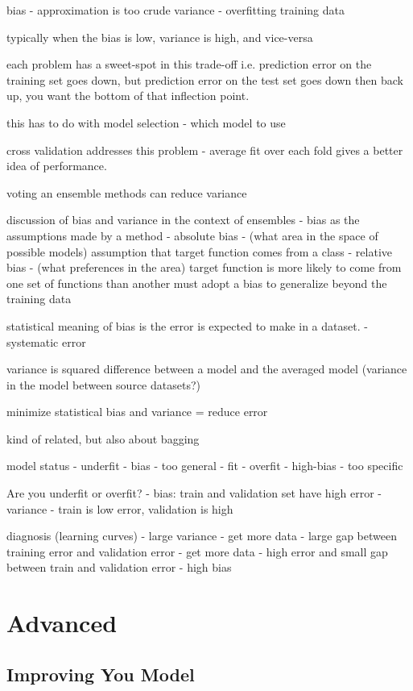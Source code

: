 \begin{bibunit}
bias - approximation is too crude
variance - overfitting training data

typically when the bias is low, variance is high, and vice-versa

each problem has a sweet-spot in this trade-off
i.e. prediction error on the training set goes down, but prediction error on the test set goes down then back up, you want the bottom of that inflection point.

this has to do with model selection - which model to use

cross validation addresses this problem - average fit over each fold gives a better idea of performance.

voting an ensemble methods can reduce variance

discussion of bias and variance in the context of ensembles \cite{Dietterich1995}
- bias as the assumptions made by a method
- absolute bias - (what area in the space of possible models) assumption that target function comes from a class
- relative bias - (what preferences in the area) target function is more likely to come from one set of functions than another
must adopt a bias to generalize beyond the training data

statistical meaning of bias is the error is expected to make in a dataset. - systematic error

variance is squared difference between a model and the averaged model (variance in the model between source datasets?)

minimize statistical bias and variance = reduce error


kind of related, but also about bagging \cite{Tibshirani1996a}

model status
- underfit - bias - too general
- fit
- overfit - high-bias - too specific

Are you underfit or overfit? 
- bias: train and validation set have high error
- variance - train is low error, validation is high

diagnosis (learning curves)
- large variance - get more data
- large gap between training error and validation error - get more data
- high error and small gap between train and validation error - high bias


\section{Advanced}

\subsection{Improving You Model}


\end{bibunit}
